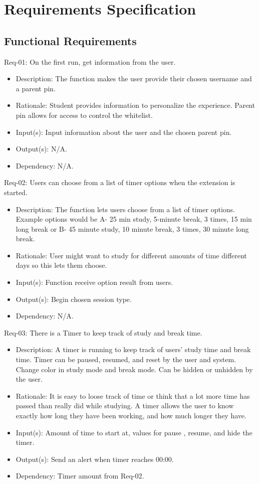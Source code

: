 \documentclass[12pt]{article}
\begin{document}
\section{Requirements Specification}
\subsection{Functional Requirements}
\noindent
Req-01: On the first run, get information from the user.
\begin{itemize}
    \item Description: The function makes the user provide their chosen username and a parent pin.
    \item Rationale: Student provides information to personalize the experience. Parent pin allows for access to control the whitelist.
    \item Input(s): Input information about the user and the chosen parent pin.
    \item Output(s): N/A.
    \item Dependency: N/A.
\end{itemize}
Req-02: Users can choose from a list of timer options when the extension is started.
\begin{itemize}
    \item Description: The function lets users choose from a list of timer options. Example options would be A- 25 min study, 5-minute break, 3 times, 15 min long break or B- 45 minute study, 10 minute break, 3 times, 30 minute long break.
    \item Rationale: User might want to study for different amounts of time different days so this lets them choose.
    \item Input(s): Function receive option result from users.
    \item Output(s): Begin chosen session type.
    \item Dependency: N/A.
\end{itemize}
Req-03:  There is a Timer to keep track of study and break time.
\begin{itemize}
    \item Description: A timer is running to keep track of users’ study time and break time. Timer can be paused, resumed, and reset by the user and system. Change color in study mode and break mode. Can be hidden or unhidden by the user.
    \item Rationale: It is easy to loose track of time or think that a lot more time has passed than really did while studying. A timer allows the user to know exactly how long they have been working, and how much longer they have.
    \item Input(s): Amount of time to start at, values for pause , resume, and hide the timer.
    \item Output(s): Send an alert when timer reaches 00:00.
    \item Dependency: Timer amount from Req-02.
\end{itemize}
\end{document}
